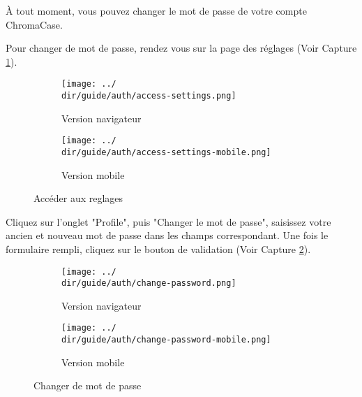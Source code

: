 À tout moment, vous pouvez changer le mot de passe de votre compte ChromaCase.

Pour changer de mot de passe, rendez vous sur la page des réglages (Voir Capture \ref{fig:access-settings-password}).

\begin{figure}[H]
	\begin{subfigure}[b]{0.7\textwidth}
		\texttt{[image: ../\\dir/guide/auth/access-settings.png]}
		\caption{Version navigateur}
	\end{subfigure}
	\begin{subfigure}[b]{0.25\textwidth}
		\texttt{[image: ../\\dir/guide/auth/access-settings-mobile.png]}
		\caption{Version mobile}
	\end{subfigure}
	\caption{Accéder aux reglages}
	\label{fig:access-settings-password}
\end{figure}

Cliquez sur l'onglet "Profile", puis "Changer le mot de passe", saisissez votre ancien et nouveau mot de passe dans les champs correspondant. Une fois le formulaire rempli, cliquez sur le bouton de validation (Voir Capture \ref{fig:change-password}).

\begin{figure}[H]
	\begin{subfigure}[b]{0.7\textwidth}
		\texttt{[image: ../\\dir/guide/auth/change-password.png]}
		\caption{Version navigateur}
	\end{subfigure}
	\begin{subfigure}[b]{0.25\textwidth}
		\texttt{[image: ../\\dir/guide/auth/change-password-mobile.png]}
		\caption{Version mobile}
	\end{subfigure}
	\caption{Changer de mot de passe}
	\label{fig:change-password}
\end{figure}